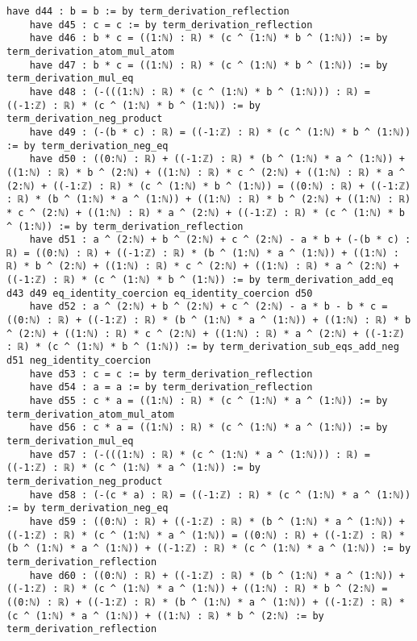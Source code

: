 \documentclass{article}
\begin{document}
\begin{tcolorbox}[colback=white!10, width=\linewidth]
\begin{lstlisting}[language=Lean4]
    have d44 : b = b := by term_derivation_reflection
    have d45 : c = c := by term_derivation_reflection
    have d46 : b * c = ((1:ℕ) : ℝ) * (c ^ (1:ℕ) * b ^ (1:ℕ)) := by term_derivation_atom_mul_atom
    have d47 : b * c = ((1:ℕ) : ℝ) * (c ^ (1:ℕ) * b ^ (1:ℕ)) := by term_derivation_mul_eq
    have d48 : (-(((1:ℕ) : ℝ) * (c ^ (1:ℕ) * b ^ (1:ℕ))) : ℝ) = ((-1:ℤ) : ℝ) * (c ^ (1:ℕ) * b ^ (1:ℕ)) := by term_derivation_neg_product
    have d49 : (-(b * c) : ℝ) = ((-1:ℤ) : ℝ) * (c ^ (1:ℕ) * b ^ (1:ℕ)) := by term_derivation_neg_eq
    have d50 : ((0:ℕ) : ℝ) + ((-1:ℤ) : ℝ) * (b ^ (1:ℕ) * a ^ (1:ℕ)) + ((1:ℕ) : ℝ) * b ^ (2:ℕ) + ((1:ℕ) : ℝ) * c ^ (2:ℕ) + ((1:ℕ) : ℝ) * a ^ (2:ℕ) + ((-1:ℤ) : ℝ) * (c ^ (1:ℕ) * b ^ (1:ℕ)) = ((0:ℕ) : ℝ) + ((-1:ℤ) : ℝ) * (b ^ (1:ℕ) * a ^ (1:ℕ)) + ((1:ℕ) : ℝ) * b ^ (2:ℕ) + ((1:ℕ) : ℝ) * c ^ (2:ℕ) + ((1:ℕ) : ℝ) * a ^ (2:ℕ) + ((-1:ℤ) : ℝ) * (c ^ (1:ℕ) * b ^ (1:ℕ)) := by term_derivation_reflection
    have d51 : a ^ (2:ℕ) + b ^ (2:ℕ) + c ^ (2:ℕ) - a * b + (-(b * c) : ℝ) = ((0:ℕ) : ℝ) + ((-1:ℤ) : ℝ) * (b ^ (1:ℕ) * a ^ (1:ℕ)) + ((1:ℕ) : ℝ) * b ^ (2:ℕ) + ((1:ℕ) : ℝ) * c ^ (2:ℕ) + ((1:ℕ) : ℝ) * a ^ (2:ℕ) + ((-1:ℤ) : ℝ) * (c ^ (1:ℕ) * b ^ (1:ℕ)) := by term_derivation_add_eq d43 d49 eq_identity_coercion eq_identity_coercion d50
    have d52 : a ^ (2:ℕ) + b ^ (2:ℕ) + c ^ (2:ℕ) - a * b - b * c = ((0:ℕ) : ℝ) + ((-1:ℤ) : ℝ) * (b ^ (1:ℕ) * a ^ (1:ℕ)) + ((1:ℕ) : ℝ) * b ^ (2:ℕ) + ((1:ℕ) : ℝ) * c ^ (2:ℕ) + ((1:ℕ) : ℝ) * a ^ (2:ℕ) + ((-1:ℤ) : ℝ) * (c ^ (1:ℕ) * b ^ (1:ℕ)) := by term_derivation_sub_eqs_add_neg d51 neg_identity_coercion
    have d53 : c = c := by term_derivation_reflection
    have d54 : a = a := by term_derivation_reflection
    have d55 : c * a = ((1:ℕ) : ℝ) * (c ^ (1:ℕ) * a ^ (1:ℕ)) := by term_derivation_atom_mul_atom
    have d56 : c * a = ((1:ℕ) : ℝ) * (c ^ (1:ℕ) * a ^ (1:ℕ)) := by term_derivation_mul_eq
    have d57 : (-(((1:ℕ) : ℝ) * (c ^ (1:ℕ) * a ^ (1:ℕ))) : ℝ) = ((-1:ℤ) : ℝ) * (c ^ (1:ℕ) * a ^ (1:ℕ)) := by term_derivation_neg_product
    have d58 : (-(c * a) : ℝ) = ((-1:ℤ) : ℝ) * (c ^ (1:ℕ) * a ^ (1:ℕ)) := by term_derivation_neg_eq
    have d59 : ((0:ℕ) : ℝ) + ((-1:ℤ) : ℝ) * (b ^ (1:ℕ) * a ^ (1:ℕ)) + ((-1:ℤ) : ℝ) * (c ^ (1:ℕ) * a ^ (1:ℕ)) = ((0:ℕ) : ℝ) + ((-1:ℤ) : ℝ) * (b ^ (1:ℕ) * a ^ (1:ℕ)) + ((-1:ℤ) : ℝ) * (c ^ (1:ℕ) * a ^ (1:ℕ)) := by term_derivation_reflection
    have d60 : ((0:ℕ) : ℝ) + ((-1:ℤ) : ℝ) * (b ^ (1:ℕ) * a ^ (1:ℕ)) + ((-1:ℤ) : ℝ) * (c ^ (1:ℕ) * a ^ (1:ℕ)) + ((1:ℕ) : ℝ) * b ^ (2:ℕ) = ((0:ℕ) : ℝ) + ((-1:ℤ) : ℝ) * (b ^ (1:ℕ) * a ^ (1:ℕ)) + ((-1:ℤ) : ℝ) * (c ^ (1:ℕ) * a ^ (1:ℕ)) + ((1:ℕ) : ℝ) * b ^ (2:ℕ) := by term_derivation_reflection

\end{lstlisting}
\end{tcolorbox}
\end{document}
